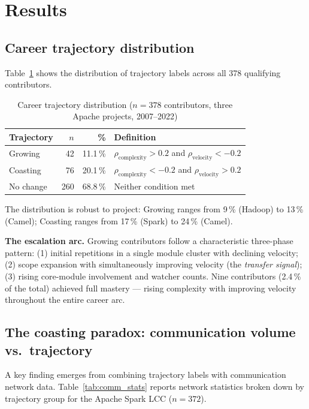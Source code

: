 \documentclass[12pt,a4paper]{article}
\begin{document}
\section{Results}

\subsection{Career trajectory distribution}

Table~\ref{tab:trajectories} shows the distribution of trajectory
labels across all 378 qualifying contributors.

\begin{table}[h]
\centering
\caption{Career trajectory distribution ($n=378$ contributors,
three Apache projects, 2007–2022)}
\label{tab:trajectories}
\begin{tabular}{lrrl}
\toprule
Trajectory & $n$ & \% & Definition \\
\midrule
Growing   & 42  & 11.1\,\% &
  $\rho_\text{complexity} > 0.2$ and $\rho_\text{velocity} < -0.2$ \\
Coasting  & 76  & 20.1\,\% &
  $\rho_\text{complexity} < -0.2$ and $\rho_\text{velocity} > 0.2$ \\
No change & 260 & 68.8\,\% & Neither condition met \\
\bottomrule
\end{tabular}
\end{table}

The distribution is robust to project: Growing ranges from 9\,\%
(Hadoop) to 13\,\% (Camel); Coasting ranges from 17\,\% (Spark)
to 24\,\% (Camel).

\textbf{The escalation arc.}
Growing contributors follow a characteristic three-phase pattern:
(1) initial repetitions in a single module cluster with declining
velocity; (2) scope expansion with simultaneously improving velocity
(the \textit{transfer signal}); (3) rising core-module involvement
and watcher counts.
Nine contributors (2.4\,\% of the total) achieved full mastery
--- rising complexity with improving velocity throughout the
entire career arc.

\subsection{The coasting paradox: communication volume vs.\ trajectory}

A key finding emerges from combining trajectory labels with
communication network data.
Table~\ref{tab:comm_stats} reports network statistics broken down
by trajectory group for the Apache Spark LCC ($n=372$).
\end{document}
